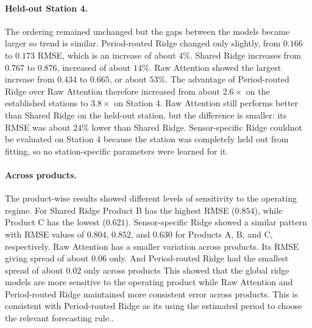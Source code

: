 \documentclass[a4, 12pt]{article}
\begin{document}
\paragraph{Held-out Station 4.}
The ordering remained unchanged but the gaps between the models became larger so trend is similar.
Period-routed Ridge changed only slightly, from \(0.166\) to \(0.173\) RMSE, which is an increase of about \(4\%\). 
Shared Ridge increases from \(0.767\) to \(0.876\),  increased of about \(14\%\). 
Raw Attention showed the largest increase from \(0.434\) to \(0.665\), or about \(53\%\).
The advantage of Period-routed Ridge over Raw Attention therefore increased from about \(2.6\times\) on the established stations to \(3.8\times\) on Station 4. 
Raw Attention still performs better than Shared Ridge on the held-out station, but the difference is smaller: its RMSE was about \(24\%\) lower than Shared Ridge.
Sensor-specific Ridge couldnot be evaluated on Station 4 because the station was completely held out from fitting, so no station-specific parameters were learned for it.

\paragraph{Across products.}
The product-wise results showed different levels of sensitivity to the operating regime. 
For Shared Ridge Product B has the highest RMSE (\(0.854\)), while Product C has the lowest (\(0.621\)). 
Sensor-specific Ridge showed a similar pattern with RMSE values of \(0.804\), \(0.852\), and \(0.630\) for Products A, B, and C, respectively.
Raw Attention has a smaller variation across products. Its RMSE giving spread of about \(0.06\) only. 
And Period-routed Ridge had the smallest spread of about \(0.02\) only across products
This showed that the global ridge models are more sensitive to the operating product while Raw Attention and  Period-routed Ridge maintained more consistent error across products. 
This is consistent with Period-routed Ridge as its using the estimated period to choose the relevant forecasting rule..

\begin{table}[htbp]
\centering
\caption{}
\label{tab:model_performance}
\end{table}
\end{document}
